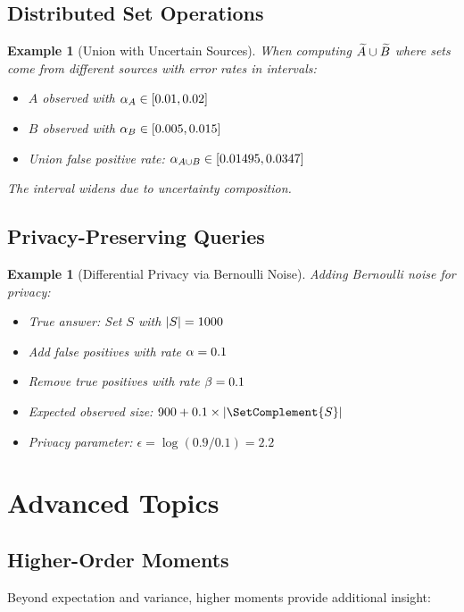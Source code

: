 \documentclass[11pt,final,hidelinks]{article}
\newtheorem{example}[theorem]{Example}
\begin{document}
\subsection{Distributed Set Operations}

\begin{example}[Union with Uncertain Sources]
When computing $\widetilde{A} \cup \widetilde{B}$ where sets come from different sources with error rates in intervals:
\begin{itemize}
    \item $A$ observed with $\alpha_A \in [0.01, 0.02]$
    \item $B$ observed with $\alpha_B \in [0.005, 0.015]$
    \item Union false positive rate: $\alpha_{A \cup B} \in [0.01495, 0.0347]$
\end{itemize}
The interval widens due to uncertainty composition.
\end{example}

\subsection{Privacy-Preserving Queries}

\begin{example}[Differential Privacy via Bernoulli Noise]
Adding Bernoulli noise for privacy:
\begin{itemize}
    \item True answer: Set $S$ with $\lvert S\rvert = 1000$
    \item Add false positives with rate $\alpha = 0.1$
    \item Remove true positives with rate $\beta = 0.1$
    \item Expected observed size: $900 + 0.1 \times \Card{\SetComplement{S}}$
    \item Privacy parameter: $\epsilon = \log(0.9/0.1) = 2.2$
\end{itemize}
\end{example}

\section{Advanced Topics}

\subsection{Higher-Order Moments}

Beyond expectation and variance, higher moments provide additional insight:
\end{document}
